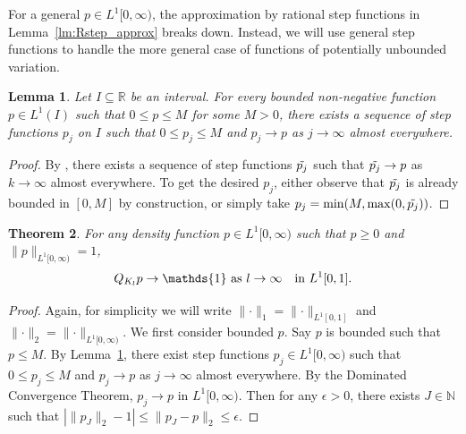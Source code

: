\documentclass[a4paper]{article}
\newtheorem{theorem}{Theorem}%
\newtheorem{lemma}[theorem]{Lemma}%
\theoremstyle{definition}
\numberwithin{equation}{section}
\numberwithin{theorem}{section}
\begin{document}
{For a general $p\in L^1[0,\infty)$, the approximation by rational step functions in Lemma~\ref{lm:Rstep_approx} breaks down. Instead, we will use general step functions to handle the more general case of functions of potentially unbounded variation.
\begin{lemma} \label{lm:genstepapprox}
    Let $I\subseteq\mathbb{R}$ be an interval. For every bounded non-negative function $p\in L^1(I)$ such that $0\leq p \leq M$ for some $M>0$, there exists a sequence of step functions $p_j$ on $I$ such that $0\leq p_j \leq M$ and $p_j \rightarrow p$ as $j\rightarrow\infty$ almost everywhere.
\end{lemma}
\begin{proof}
    By \cite[Theorem 4.3]{stein2005real}, there exists a sequence of step functions $\Tilde{p_j}$ such that $\Tilde{p_j}\rightarrow p$ as $k\rightarrow\infty$ almost everywhere. To get the desired $p_j$, either observe that $\Tilde{p_j}$ is already bounded in $[0,M]$ by construction, or simply take $p_j = \min(M,\max(0, \Tilde{p_j}))$.
\end{proof}

\begin{theorem} \label{thm:general_convergence}
    For any density function $p\in L^1[0,\infty)$ such that $p\geq0$ and $\lVert p\rVert_{ L^1[0,\infty)}=1$,
    \begin{equation*}
        Q_{K_{l}} p \rightarrow \mathds{1}\text{ as $l\rightarrow\infty$}\quad\text{in $ L^1[0,1]$.}
    \end{equation*}
\end{theorem}
\begin{proof}
    Again, for simplicity we will write $\lVert\cdot\rVert_1=\lVert\cdot\rVert_{ L^1[0,1]}$ and $\lVert\cdot\rVert_2=\lVert\cdot\rVert_{ L^1[0,\infty)}$. We first consider bounded $p$. Say $p$ is bounded such that $p\leq M$. By Lemma~\ref{lm:genstepapprox}, there exist step functions $p_j\in L^1[0,\infty)$ such that $0\leq p_j\leq M$ and $p_j\rightarrow p$ as $j\rightarrow\infty$ almost everywhere. By the Dominated Convergence Theorem, $p_j\rightarrow p$ in $ L^1[0,\infty)$. Then for any $\epsilon>0$, there exists $J\in\mathbb{N}$ such that $|\lVert p_J\rVert_2-1| \leq \lVert p_J-p\rVert_2 \leq \epsilon$.


\end{proof}}
\end{document}
